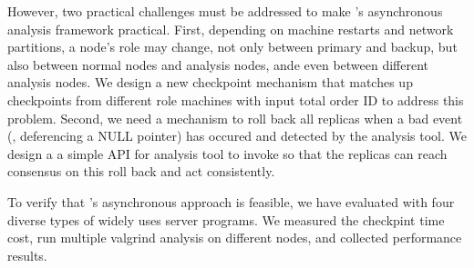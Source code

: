 However, two practical challenges must be addressed to make \xxx's asynchronous 
analysis framework practical. First, depending on machine restarts and network 
partitions, a node's role may change, not only between primary and backup, but 
also between normal nodes and analysis nodes, ande even between different 
analysis nodes. We design a new checkpoint mechanism that matches up 
checkpoints from different role machines with input total order ID to address 
this problem. Second, we need a mechanism to roll back all replicas when a bad 
event (\eg, deferencing a NULL pointer) has occured and detected by the 
analysis tool. We design a a simple API for analysis tool to invoke so that the 
replicas can reach consensus on this roll back and act consistently.

To verify that \xxx's asynchronous approach is feasible, we have evaluated 
\xxx with four diverse types of widely uses server programs. We measured the 
checkpint time cost, run multiple valgrind analysis on different nodes, and 
collected performance results.



